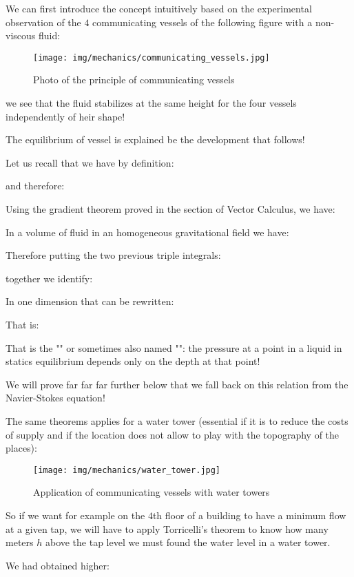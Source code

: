 	We can first introduce the concept intuitively based on the experimental observation of the $4$ communicating vessels of the following figure with a non-viscous fluid:
	\begin{figure}[H]
		\centering
		\texttt{[image: img/mechanics/communicating\_vessels.jpg]}
		\caption{Photo of the principle of communicating vessels}
	\end{figure}
	we see that the fluid stabilizes at the same height for the four vessels independently of heir shape!

	The equilibrium of vessel is explained be the development that follows!
	
	Let us recall that we have by definition:
	
	and therefore:
	
	Using the gradient theorem proved in the section of Vector Calculus, we have:
	
	In a volume of fluid in an homogeneous gravitational field we have:
	
	Therefore putting the two previous triple integrals: 
	
	together we identify:
	
	In one dimension that can be rewritten:
	
	That is:
	
	That is the "" or sometimes also named "": the pressure at a point in a liquid in statics equilibrium depends only on the depth at that point!
	\begin{tcolorbox}[title=Remark,colframe=black,arc=10pt]
	We will prove far far far further below that we fall back on this relation from the Navier-Stokes equation!
	\end{tcolorbox}
	The same theorems applies for a water tower (essential if it is to reduce the costs of supply and if the location does not allow to play with the topography of the places):
	\begin{figure}[H]
		\centering
		\texttt{[image: img/mechanics/water\_tower.jpg]}
		\caption{Application of communicating vessels with water towers}
	\end{figure}
	So if we want for example on the $4$th floor of a building to have a minimum flow at a given tap, we will have to apply Torricelli's theorem to know how many meters $h$ above the tap level we must found the water level in a water tower.

	We had obtained higher:
	
